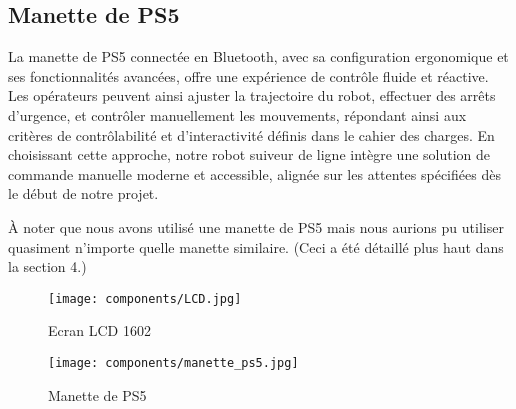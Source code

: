 \begin{comment}
\begin{figure}[h]
    \centering
    \texttt{[image: components/LCD.jpg]}
    \caption{Ecran LCD 1602}
    \label{fig:LCD1602}
\end{figure}
\end{comment}

\newpage

\subsection{Manette de PS5}
La manette de PS5 connectée en Bluetooth, avec sa configuration ergonomique et ses fonctionnalités avancées, offre une expérience de contrôle fluide et réactive. Les opérateurs peuvent ainsi ajuster la trajectoire du robot, effectuer des arrêts d'urgence, et contrôler manuellement les mouvements, répondant ainsi aux critères de contrôlabilité et d'interactivité définis dans le cahier des charges. En choisissant cette approche, notre robot suiveur de ligne intègre une solution de commande manuelle moderne et accessible, alignée sur les attentes spécifiées dès le début de notre projet.

À noter que nous avons utilisé une manette de PS5 mais nous aurions pu utiliser quasiment n'importe quelle manette similaire. (Ceci a été détaillé plus haut dans la section 4.)

\begin{comment}
\begin{figure}[h]
    \centering
    \texttt{[image: components/manette\_ps5.jpg]}
    \caption{Manette de PS5}
    \label{fig:Manette de PS5}
\end{figure}
\end{comment}

\bigbreak
\begin{figure}[h]
    \begin{minipage}[c]{.46\linewidth}
        \centering
        \texttt{[image: components/LCD.jpg]}
        \caption{Ecran LCD 1602}
        \label{fig:LCD1602}
    \end{minipage}
    \hfill%
    \begin{minipage}[c]{.46\linewidth}
        \centering
        \texttt{[image: components/manette\_ps5.jpg]}
        \caption{Manette de PS5}
        \label{fig:Manette de PS5}
    \end{minipage}
\end{figure}

\newpage